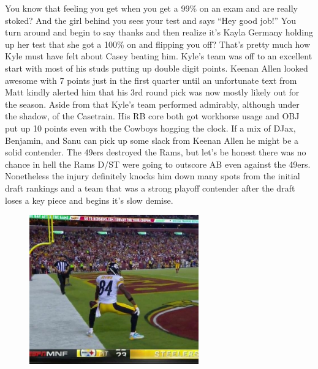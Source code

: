 \documentclass[11pt,letterpaper]{article}
\begin{document}
\newpage
{}
\par\noindent You know that feeling you get when you get a 99\% on an exam and are really stoked? And the girl behind you sees your test and says ``Hey good job!'' You turn around and begin to say thanks and then realize it's Kayla Germany holding up her test that she got a 100\% on and flipping you off? That's pretty much how Kyle must have felt about Casey beating him. Kyle's team was off to an excellent start with most of his studs putting up double digit points. Keenan Allen looked awesome with 7 points just in the first quarter until an unfortunate text from Matt kindly alerted him that his 3rd round pick was now mostly likely out for the season. Aside from that Kyle's team performed admirably, although under the shadow, of the Casetrain. His RB core both got workhorse usage and OBJ put up 10 points even with the Cowboys hogging the clock. If a mix of DJax, Benjamin, and Sanu can pick up some slack from Keenan Allen he might be a solid contender. The 49ers destroyed the Rams, but let's be honest there was no chance in hell the Rams D/ST were going to outscore AB even against the 49ers. Nonetheless the injury definitely knocks him down many spots from the initial draft rankings and a team that was a strong playoff contender after the draft loses a key piece and begins it's slow demise.
\begin{figure}
\centering
\includegraphics[width=0.65\textwidth]{week1-antonio.png}
\label{fig:week1-antonio}
\end{figure} 
\bigskip
\end{document}
